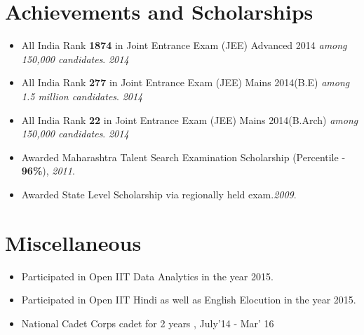 \documentclass[11pt,a4paper]{moderncv}
\begin{document}
\vspace{-0.1cm}
\section*{Achievements and Scholarships}
\begin{itemize}
  \setlength\itemsep{0.5em}
\item All India Rank \textbf{1874} in Joint Entrance Exam (JEE) Advanced
2014 \textit{among 150,000 candidates}.             \hfill \textit{2014}

\item All India Rank \textbf{277} in Joint Entrance Exam (JEE) Mains 2014(B.E) \textit{among 1.5 million candidates}.              \hfill \textit{2014}

\item All India Rank \textbf{22} in Joint Entrance Exam (JEE) Mains 2014(B.Arch) \textit{among 150,000 candidates}.              \hfill \textit{2014}

\item Awarded Maharashtra Talent Search Examination Scholarship (Percentile - \textbf{96\%}), \textit{2011}.

\item Awarded State Level Scholarship via regionally held exam.\textit{2009}.

\end{itemize}

\section*{Miscellaneous}
\begin{itemize}
  \item Participated in Open IIT Data Analytics in the year 2015.
  \item Participated in Open IIT Hindi as well as English Elocution in the year 2015.
  \item National Cadet Corps cadet for 2 years , July'14 - Mar' 16
\end{itemize}
\end{document}
